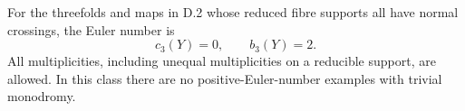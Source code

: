 \begin{proposition}\hypertarget{tag-01GB}{}\label{cdp:st:D.2.4}



For the threefolds and maps in D.2 whose reduced fibre supports
all have normal crossings, the Euler number is
\[
c_3(Y)=0,\qquad b_3(Y)=2.
\]
All multiplicities, including unequal multiplicities on a
reducible support, are allowed. In this class there are no
positive-Euler-number examples with trivial monodromy.
\end{proposition}

